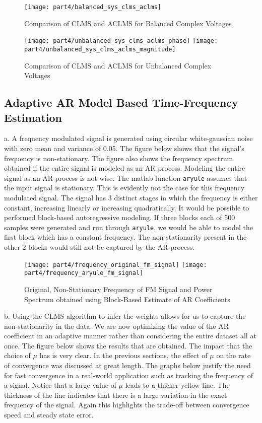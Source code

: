 \begin{figure}[H]
\centering{}
\texttt{[image: part4/balanced\_sys\_clms\_aclms]}
\caption{Comparison of CLMS and ACLMS for Balanced Complex Voltages}
\end{figure}

\noindent{}

\begin{figure}[H]
\centering{}
\texttt{[image: part4/unbalanced\_sys\_clms\_aclms\_phase]}
\texttt{[image: part4/unbalanced\_sys\_clms\_aclms\_magnitude]}
\caption{Comparison of CLMS and ACLMS for Unbalanced Complex Voltages}
\label{fig:unbalanced}
\end{figure}


\subsection{Adaptive AR Model Based Time-Frequency Estimation}

\noindent{}a. A frequency modulated signal is generated using circular white-gaussian noise with zero mean and variance of 0.05. The figure below shows that the signal's frequency is non-stationary. The figure also shows the frequency spectrum obtained if the entire signal is modeled as an AR process. Modeling the entire signal as an AR-process is not wise. The matlab function \texttt{aryule} assumes that the input signal is stationary. This is evidently not the case for this frequency modulated signal. The signal has 3 distinct stages in which the frequency is either constant, increasing linearly or increasing quadratically. It would be possible to performed block-based autoregressive modeling. If three blocks each of 500 samples were generated and run through \texttt{aryule}, we would be able to model the first block which has a constant frequency. The non-stationarity present in the other 2 blocks would still not be captured by the AR process. 

\begin{figure}[H]
\centering{}
\texttt{[image: part4/frequency\_original\_fm\_signal]}
\texttt{[image: part4/frequency\_aryule\_fm\_signal]}
\caption{Original, Non-Stationary Frequency of FM Signal and Power Spectrum obtained using Block-Based Estimate of AR Coefficients}
\end{figure}

\noindent{}b. Using the CLMS algorithm to infer the weights allows for us to capture the non-stationarity in the data. We are now optimizing the value of the AR coefficient in an adaptive manner rather than considering the entire dataset all at once. The figure below shows the results that are obtained. The impact that the choice of $\mu$ has is very clear. In the previous sections, the effect of $\mu$ on the rate of convergence was discussed at great length. The graphs below justify the need for fast convergence in a real-world application such as tracking the frequency of a signal. Notice that a large value of $\mu$ leads to a thicker yellow line. The thickness of the line indicates that there is a large variation in the exact frequency of the signal. Again this highlights the trade-off between convergence speed and steady state error.

